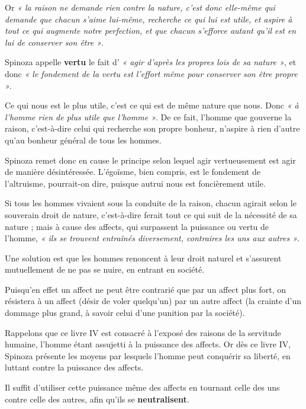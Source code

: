 Or {\it « la raison ne demande rien contre la nature, c’est donc elle-même qui
demande que chacun s’aime lui-même, recherche ce qui lui est utile, et
aspire à tout ce qui augmente notre perfection, et que chacun s’efforce
autant qu’il est en lui de conserver son être »}.

Spinoza appelle {\bf vertu} le fait d’ {\it « agir d’après les propres lois de sa nature »},
et donc {\it « le fondement de la vertu est l’effort même pour conserver son être
propre »}.

Ce qui nous est le plus utile, c’est ce qui est de même nature que nous. Donc
{\it « à l’homme rien de plus utile que l’homme »}. De ce fait, l’homme que gouverne
la raison, c’est-à-dire celui qui recherche son propre bonheur, n’aspire à
rien d’autre qu’au bonheur général de tous les hommes.

Spinoza remet donc en cause le principe selon lequel agir vertueusement est
agir de manière désintéressée. L’égoïsme, bien compris, est le fondement de
l’altruisme, pourrait-on dire, puisque autrui nous est foncièrement utile.

\vspace{0.5cm}
Si tous les hommes vivaient sous la conduite de la raison, chacun agirait
selon le souverain droit de nature, c’est-à-dire ferait tout ce qui suit de
la nécessité de sa nature ; mais à cause des affects, qui surpassent la
puissance ou vertu de l’homme, {\it « ils se trouvent entraînés diversement,
contraires les uns aux autres »}.

\vspace{0.5cm}
Une solution est que les hommes renoncent à leur droit naturel et s’assurent
mutuellement de ne pas se nuire, en entrant en société.

Puisqu’en effet un affect ne peut être contrarié que par un affect plus fort,
on résistera à un affect (désir de voler quelqu’un) par un autre affect (la
crainte d’un dommage plus grand, à savoir celui d’une punition par la société).

\vspace{0.5cm}
Rappelons que ce livre IV est consacré à l’exposé des raisons de la servitude
humaine, l’homme étant assujetti à la puissance des affects. Or dès ce livre
IV, Spinoza présente les moyens par lesquels l’homme peut conquérir sa liberté,
en luttant contre la puissance des affects.

Il suffit d’utiliser cette puissance même des affects en tournant celle des uns
contre celle des autres, afin qu’ils se {\bf neutralisent}.

